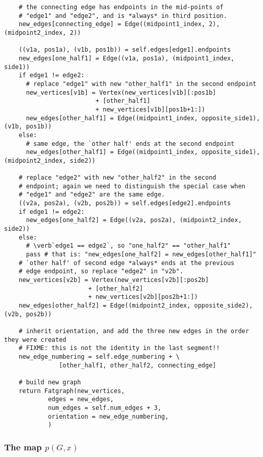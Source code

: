 \begin{lstlisting}
    # the connecting edge has endpoints in the mid-points of
    # "edge1" and "edge2", and is *always* in third position.
    new_edges[connecting_edge] = Edge((midpoint1_index, 2), (midpoint2_index, 2))

    ((v1a, pos1a), (v1b, pos1b)) = self.edges[edge1].endpoints
    new_edges[one_half1] = Edge((v1a, pos1a), (midpoint1_index, side1))
    if edge1 != edge2:
      # replace "edge1" with new "other_half1" in the second endpoint
      new_vertices[v1b] = Vertex(new_vertices[v1b][:pos1b]
                         + [other_half1]
                         + new_vertices[v1b][pos1b+1:])
      new_edges[other_half1] = Edge((midpoint1_index, opposite_side1), (v1b, pos1b))
    else:
      # same edge, the `other half' ends at the second endpoint
      new_edges[other_half1] = Edge((midpoint1_index, opposite_side1), (midpoint2_index, side2))

    # replace "edge2" with new "other_half2" in the second
    # endpoint; again we need to distinguish the special case when
    # "edge1" and "edge2" are the same edge.
    ((v2a, pos2a), (v2b, pos2b)) = self.edges[edge2].endpoints
    if edge1 != edge2:
      new_edges[one_half2] = Edge((v2a, pos2a), (midpoint2_index, side2))
    else:
      # \verb`edge1 == edge2`, so "one_half2" == "other_half1"
      pass # that is: "new_edges[one_half2] = new_edges[other_half1]"
    # `other half' of second edge *always* ends at the previous
    # edge endpoint, so replace "edge2" in "v2b".
    new_vertices[v2b] = Vertex(new_vertices[v2b][:pos2b]
                       + [other_half2]
                       + new_vertices[v2b][pos2b+1:])
    new_edges[other_half2] = Edge((midpoint2_index, opposite_side2), (v2b, pos2b))

    # inherit orientation, and add the three new edges in the order they were created
    # FIXME: this is not the identity in the last segment!!
    new_edge_numbering = self.edge_numbering + \
               [other_half1, other_half2, connecting_edge]

    # build new graph 
    return Fatgraph(new_vertices,
            edges = new_edges,
            num_edges = self.num_edges + 3,
            orientation = new_edge_numbering,
            )

\end{lstlisting}


\subsubsection{The map $p(G,x)$}
\label{sec:hangcircle}

